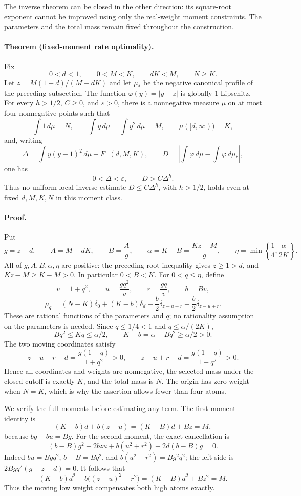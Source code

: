 The inverse theorem can be closed in the other direction: its square-root
exponent cannot be improved using only the real-weight moment constraints.
The parameters and the total mass remain fixed throughout the construction.

\paragraph{Theorem (fixed-moment rate optimality).}
Fix
\[
 0<d<1,\qquad 0<M<K,\qquad dK<M,\qquad N\ge K.
\]
Let \(z=M(1-d)/(M-dK)\) and let \(\mu_*\) be the negative canonical
profile of the preceding subsection.  The function
\(\varphi(y)=|y-z|\) is globally \(1\)-Lipschitz.
For every \(h>1/2\), \(C\ge0\), and \(\varepsilon>0\), there is a
nonnegative measure \(\mu\) on at most four nonnegative points such that
\[
 \int1\,d\mu=N,\qquad
 \int y\,d\mu=\int y^2\,d\mu=M,\qquad
 \mu([d,\infty))=K,
\]
and, writing
\[
 \Delta=\int y(y-1)^2\,d\mu-F_-(d,M,K),\qquad
 D=\left|\int\varphi\,d\mu-\int\varphi\,d\mu_*\right|,
\]
one has
\[
 0<\Delta<\varepsilon,\qquad D>C\Delta^h.
\]
Thus no uniform local inverse estimate \(D\le C\Delta^h\), with
\(h>1/2\), holds even at fixed \(d,M,K,N\) in this moment class.

\paragraph{Proof.}
Put
\[
 g=z-d,\qquad A=M-dK,\qquad
 B=\frac{A}{g},\qquad
 \alpha=K-B=\frac{Kz-M}{g},\qquad
 \eta=\min\left\{\frac14,\frac{\alpha}{2K}\right\}.
\]
All of \(g,A,B,\alpha,\eta\) are positive: the preceding root
inequality gives \(z\ge1>d\), and \(Kz-M\ge K-M>0\).
In particular \(0<B<K\).
For \(0<q\le\eta\), define
\[
 v=1+q^2,\qquad
 u=\frac{gq^2}{v},\qquad r=\frac{gq}{v},\qquad b=Bv,
\]
\[
 \mu_q=(N-K)\delta_0+(K-b)\delta_d+
       \frac b2\delta_{z-u-r}+\frac b2\delta_{z-u+r}.
\]
These are rational functions of the parameters and \(q\); no rationality
assumption on the parameters is needed.
Since \(q\le1/4<1\) and \(q\le\alpha/(2K)\),
\[
 Bq^2\le Kq\le\alpha/2,\qquad
 K-b=\alpha-Bq^2\ge\alpha/2>0.
\]
The two moving coordinates satisfy
\[
 z-u-r-d=\frac{g(1-q)}{1+q^2}>0,\qquad
 z-u+r-d=\frac{g(1+q)}{1+q^2}>0.
\]
Hence all coordinates and weights are nonnegative, the selected mass
under the closed cutoff is exactly \(K\), and the total mass is \(N\).
The origin has zero weight when \(N=K\), which is why the assertion
allows fewer than four atoms.

We verify the full moments before estimating any term.
The first-moment identity is
\[
 (K-b)d+b(z-u)=(K-B)d+Bz=M,
\]
because \(bg-bu=Bg\).  For the second moment, the exact cancellation is
\[
 (b-B)g^2-2bzu+b(u^2+r^2)
       +2d(b-B)g=0.
\]
Indeed \(bu=Bgq^2\), \(b-B=Bq^2\), and
\(b(u^2+r^2)=Bg^2q^2\); the left side is
\(2Bgq^2(g-z+d)=0\).
It follows that
\[
 (K-b)d^2+b\bigl((z-u)^2+r^2\bigr)
       =(K-B)d^2+Bz^2=M.
\]
Thus the moving low weight compensates both high atoms exactly.

